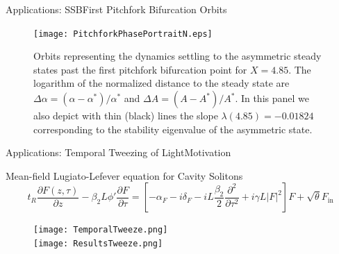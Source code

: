 \begin{frame}[c]{Applications: SSB}{First Pitchfork Bifurcation Orbits}
\begin{figure}[h]
\centering
\texttt{[image: PitchforkPhasePortraitN.eps]}
\caption{Orbits representing the dynamics settling to the
asymmetric steady states past the first pitchfork bifurcation point for $X=4.85$. 
The logarithm of the normalized distance to the
steady state are $\Delta \alpha=(\alpha-\alpha^*)/\alpha^*$ 
and $\Delta A=(A-A^*)/A^*$.  In this panel we also depict with thin (black) lines the slope 
$\lambda(4.85)=-0.01824$ corresponding 
to the stability eigenvalue of the asymmetric state.
}
\end{figure}
\end{frame}


\begin{frame}[c]{Applications: Temporal Tweezing of Light}{\textcolor{paleblue}{Motivation} }
\begin{block}{\small{Mean-field Lugiato-Lefever equation for Cavity Solitons}}
\tiny{\[ 
t_R \frac{\partial F(z,\tau)}{\partial z} - \beta_2 L \phi' \frac{\partial F}{\partial \tau} = \left[ -\alpha_F - i \delta_F - i L \frac{\beta_2}{2} \frac{\partial^2}{\partial \tau^2} + i \gamma L |F|^2 \right] F + \sqrt{\theta} F_{\mathrm{in}} 
\] }
\end{block}
\begin{figure}[H!]
\centering
\texttt{[image: TemporalTweeze.png]} \\
\texttt{[image: ResultsTweeze.png]}
\caption{\tiny{}}
\end{figure}

\end{frame}

